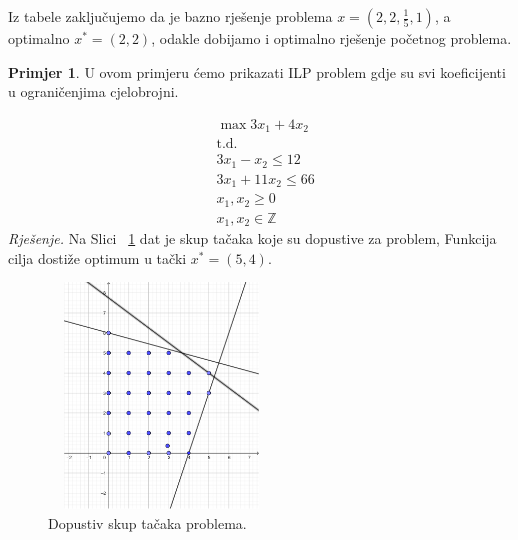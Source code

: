 \documentclass[a4paper, utf8, 11pt, colorlinks]{book}
\theoremstyle{definition}
\newtheorem{primjer}{Primjer}[chapter]
\begin{document}
Iz tabele zaključujemo da je bazno rješenje problema 
$x=(2,2, \frac{1}{5}, 1)$, a optimalno $x^* = (2, 2)$, odakle dobijamo i optimalno rješenje početnog problema. 


\begin{primjer} U ovom primjeru ćemo prikazati ILP problem gdje su svi koeficijenti u ograničenjima cjelobrojni.
	\end{primjer}
\begin{align*}
    &\max 3 x_1 + 4 x_2 \\
    &\mbox{t.d.} \\
    & 3 x_1 - x_2 \leq 12 \\
    & 3 x_1 + 11 x_2 \leq 66 \\
    & x_1, x_2 \geq 0 \\
    & x_1, x_2 \in \mathbb{Z}
\end{align*}
\emph{Rješenje. }
Na Slici~ \ref{fig:region_ilp_primjer_2} dat je skup tačaka koje su dopustive za problem, Funkcija cilja dostiže optimum u tački $x^*=(5,4)$.
\begin{figure}
    \centering
    \includegraphics[width=170pt,height=170pt]{region_ilp_primjer_2.eps}
    \caption{Dopustiv skup tačaka problema.}
    \label{fig:region_ilp_primjer_2}
\end{figure}
\end{document}
